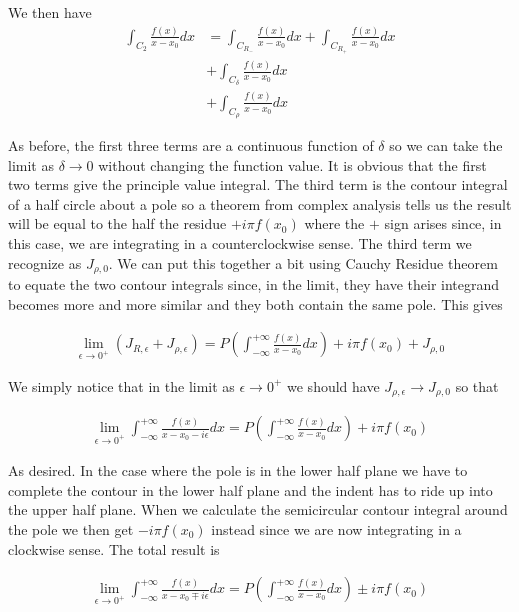 \documentclass[12pt]{article}
\begin{document}
We then have
\begin{align}
\int_{C_2} \frac{f(x)}{x - x_0} dx &=\int_{C_{R_-}} \frac{f(x)}{x - x_0} dx + \int_{C_{R_+}} \frac{f(x)}{x - x_0} dx\\
&+\int_{C_{\delta}} \frac{f(x)}{x - x_0} dx\\
&+\int_{C_{\rho}} \frac{f(x)}{x - x_0} dx
\end{align}

As before, the first three terms are a continuous function of $\delta$ so we can take the limit as $\delta\rightarrow 0$ without changing the function value. It is obvious that the first two terms give the principle value integral. The third term is the contour integral of a half circle about a pole so a theorem from complex analysis tells us the result will be equal to the half the residue $+i\pi f(x_0)$ where the $+$ sign arises since, in this case, we are integrating in a counterclockwise sense. The third term we recognize as $J_{\rho,0}$. We can put this together a bit using Cauchy Residue theorem to equate the two contour integrals since, in the limit, they have their integrand becomes more and more similar and they both contain the same pole. This gives

\begin{align}
\lim_{\epsilon\rightarrow 0^+}(J_{R,\epsilon}+J_{\rho,\epsilon}) = P\left(\int_{-\infty}^{+\infty}\frac{f(x)}{x-x_0} dx\right) + i \pi f(x_0) + J_{\rho,0}
\end{align}

We simply notice that in the limit as $\epsilon \rightarrow 0^+$ we should have $J_{\rho,\epsilon} \rightarrow J_{\rho,0}$ so that

\begin{align}
\lim_{\epsilon \rightarrow 0^+} \int_{-\infty}^{+\infty} \frac{f(x)}{x-x_0 - i \epsilon} dx = P\left(\int_{-\infty}^{+\infty} \frac{f(x)}{x-x_0} dx \right) + i \pi f(x_0)
\end{align}

As desired. In the case where the pole is in the lower half plane we have to complete the contour in the lower half plane and the indent has to ride up into the upper half plane. When we calculate the semicircular contour integral around the pole we then get $-i\pi f(x_0)$ instead since we are now integrating in a clockwise sense. The total result is

\begin{align}
\lim_{\epsilon \rightarrow 0^+} \int_{-\infty}^{+\infty} \frac{f(x)}{x-x_0 \mp i \epsilon} dx = P\left(\int_{-\infty}^{+\infty} \frac{f(x)}{x-x_0} dx \right) \pm i \pi f(x_0)
\end{align}
\end{document}
